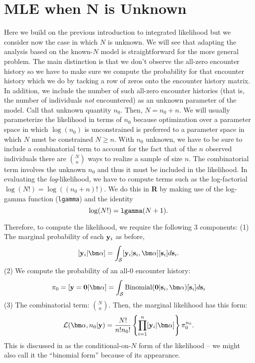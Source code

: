 

\section{MLE when N is Unknown} 
\label{mle.sec.Nunknown}

Here we build on the previous introduction to integrated likelihood
but we consider now the case in which $N$ is unknown. We will see that
adapting the analysis based on the known-$N$ model is 
straightforward for the more general problem. The main distinction is
that we don't observe the all-zero encounter history so we have to
make sure we compute the probability for that encounter history which
we do by tacking a row of zeros onto the encounter history matrix. In
addition, we include the number of such all-zero encounter histories
(that is, the number of individuals {\it not} encountered)
as an unknown parameter of the model. Call that unknown quantity
$n_{0}$. Then, $N=n_{0}+n$. We will usually parameterize the
likelihood in terms of $n_{0}$ because optimization over a parameter
space in which $\log(n_{0})$ is unconstrained is preferred to a
parameter space in which $N$ must be constrained $N\ge n$.
With $n_{0}$ unknown, we have to be sure to include a combinatorial term to
account for the fact that of the $n$ observed individuals there are
${N \choose n}$ 
ways to realize a sample of size $n$. The
combinatorial term involves the unknown $n_{0}$ and thus it must be
included in the likelihood. In evaluating the {\it log}-likelihood, we
have to compute terms such as the log-factorial $\log(N!) = \log((n_{0}+n)!)$. 
We do this in {\bf R} by making use of the log-gamma function
(\mbox{\tt lgamma}) and the identity
\[
 \log(N!) = \mbox{\tt lgamma}(N+1).
\]

Therefore, to compute the likelihood, we require 
the following 3 components: (1) The marginal
probability of each ${\bf y}_{i}$ as before,
\[
  [{\bf y}_{i}|{\bm \alpha}] = 
\int_{{\cal S}} [{\bf y}_{i} |{\bf s}_{i}, {\bm
  \alpha}] [{\bf s}_{i}] d{\bf s}_{i}.
\]
(2) We compute
the probability of an all-0 encounter history:
\[
\pi_{0} = [{\bf y} = {\bf 0} | {\bm \alpha}] = 
\int_{{\cal S}} \mbox{Binomial}({\bf 0} |{\bf s}_{i}, {\bm \alpha})[{\bf s}_{i}] d{\bf s}_{i}
\]
(3) The combinatorial term: ${N \choose n}$. Then, 
 the marginal likelihood has this form:
\begin{equation}
 {\cal L}({\bm \alpha}, n_{0}| {\bf y})  = \frac{N!}{n! n_{0}!}
 \left\{ \prod_{i=1}^{n}  [{\bf y}_{i}|{\bm \alpha}] \right\}
\pi_{0}^{n_{0}}.
\label{mle.eq.binomialform}
\end{equation}
This is discussed in \citet[][p. 379]{borchers_efford:2008} as the
conditional-on-$N$ form of the likelihood -- we might also call it
the ``binomial form'' because of its appearance. 

